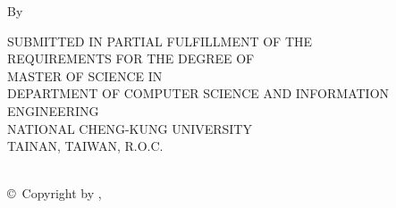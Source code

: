 
    \newpage
    \thispagestyle{empty}%


\ifx\mywatermark\undefined 
  \thispagestyle{empty}  %
\else
  \thispagestyle{EmptyWaterMarkPage} %
\fi
    \null\vskip0.5in
    \begin{center}
        \Large\uppercase\expandafter{\eTitle}
    \end{center}
    \vfill
    \begin{center}
        \large\rm By \\
        {\large\rm \myEname}
    \end{center}
    \vfill
    \begin{center}
        \footnotesize SUBMITTED IN PARTIAL FULFILLMENT OF THE \\
        REQUIREMENTS FOR THE DEGREE OF \\
        MASTER OF SCIENCE IN \\
        DEPARTMENT OF COMPUTER SCIENCE AND INFORMATION ENGINEERING \\
        NATIONAL CHENG-KUNG UNIVERSITY \\
        TAINAN, TAIWAN, R.O.C. \\
        {\eMonth \ \eYear}
    \end{center}
    \vskip0.75in
    \begin{center}
        \rm \copyright\ Copyright by {\myEname}, \eYear
    \end{center}

